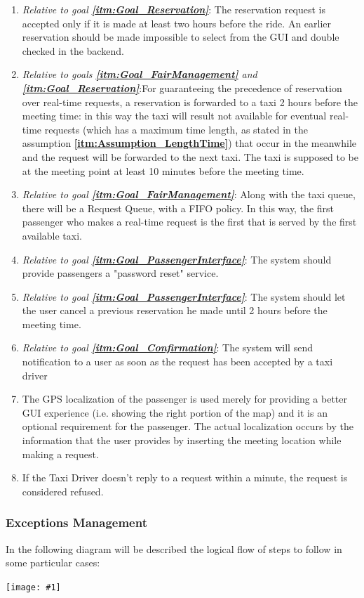 \documentclass[11pt, a4paper,titlepage]{article}
\newcommand{\image}[1]{
	\begin{center}
		\noindent \texttt{[image: \#1]}
	\end{center}
	}
\newcommand{\linkitm}[1]{\underline{\textbf{\ref{#1}}}}
\begin{document}
\begin{enumerate}
		\item \textit{Relative to goal \linkitm{itm:Goal_Reservation}}: The reservation request is accepted only if it is made at least two hours before the ride. An earlier reservation should be made impossible to select from the GUI and double checked in the backend.
		\item \textit{Relative to goals \linkitm{itm:Goal_FairManagement} and \linkitm{itm:Goal_Reservation}}:For guaranteeing the precedence of reservation over real-time requests, a reservation is forwarded to a taxi 2 hours before the meeting time: in this way the taxi will result not available for eventual real-time requests (which has a maximum time length, as stated in the assumption \linkitm{itm:Assumption_LengthTime}) that occur in the meanwhile and the request will be forwarded to the next taxi. The taxi is supposed to be at the meeting point at least 10 minutes before the meeting time.
		\item \textit{Relative to goal \linkitm{itm:Goal_FairManagement}}: Along with the taxi queue, there will be a Request Queue, with a FIFO policy. In this way, the first passenger who makes a real-time request is the first that is served by the first available taxi. 
		\item \textit{Relative to goal \linkitm{itm:Goal_PassengerInterface}}: The system should provide passengers a "password reset" service.
		\item \textit{Relative to goal \linkitm{itm:Goal_PassengerInterface}}: The system should let the user cancel a previous reservation he made until 2 hours before the meeting time.
		\item \textit{Relative to goal \linkitm{itm:Goal_Confirmation}}: The system will send notification to a user as soon as the request has been accepted by a taxi driver
		\item The GPS localization of the passenger is used merely for providing a better GUI experience (i.e. showing the right portion of the map) and it is an optional requirement for the passenger. The actual localization occurs by the information that the user provides by inserting the meeting location while making a request.
		\item If the Taxi Driver doesn't reply to a request within a minute, the request is considered refused.	
	\end{enumerate}

	\subsubsection{Exceptions Management}
		In the following diagram will be described the logical flow of steps to follow in some particular cases: \newline
		\image{schema_exceptions.png}
\end{document}
